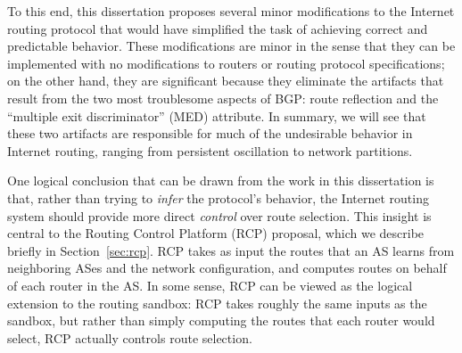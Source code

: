 To this end, this dissertation proposes several minor modifications to
the Internet routing protocol that would have simplified the task of
achieving correct and predictable behavior.  These modifications are
minor in the sense that they can be implemented with no modifications to
routers or routing protocol specifications; on the other hand, they are
significant because they eliminate the artifacts that result from the
two most troublesome aspects of BGP: route reflection and the ``multiple
exit discriminator'' (MED) attribute.  In summary, we will see that
these two artifacts are responsible for much of the undesirable behavior
in Internet routing, ranging from persistent oscillation to network
partitions.  

One logical conclusion that can be drawn from the work in
this dissertation is that, rather than trying to {\em infer} the
protocol's behavior, the Internet routing system should provide more
direct {\em control} over route selection.
%
This insight is central to the Routing Control Platform (RCP) proposal,
which we describe briefly in Section~\ref{sec:rcp}.  RCP takes as input
the routes that an AS learns from neighboring ASes and the network
configuration, and computes routes on behalf of each router in the AS.
In some sense, RCP can be viewed as the logical extension to the routing
sandbox: RCP takes roughly the same inputs as the sandbox, but rather
than simply computing the routes that each router would select, RCP
actually controls route selection.

